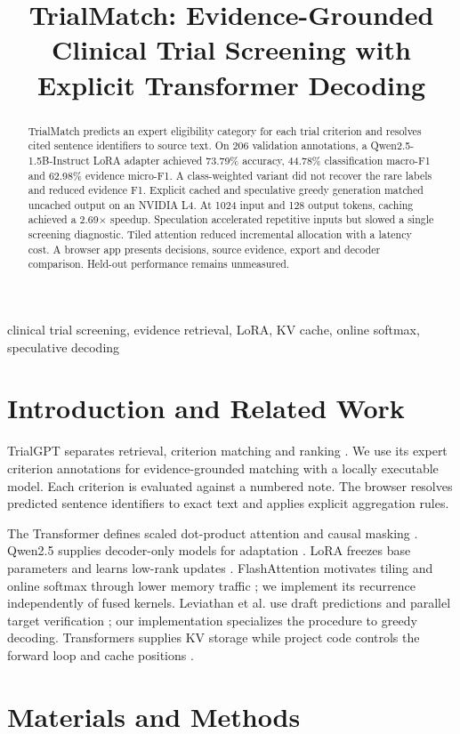 \documentclass[conference]{IEEEtran}
\title{TrialMatch: Evidence-Grounded Clinical Trial Screening with Explicit Transformer Decoding}
\author{\IEEEauthorblockN{Muhammad Shaffan Ahmad}
\IEEEauthorblockA{23i-0673, Generative AI, Section A\\FAST-NUCES, Islamabad}}
\begin{document}
\maketitle
\begin{abstract}
TrialMatch predicts an expert eligibility category for each trial criterion and resolves cited sentence identifiers to source text. On 206 validation annotations, a Qwen2.5-1.5B-Instruct LoRA adapter achieved 73.79\% accuracy, 44.78\% classification macro-F1 and 62.98\% evidence micro-F1. A class-weighted variant did not recover the rare labels and reduced evidence F1. Explicit cached and speculative greedy generation matched uncached output on an NVIDIA L4. At 1024 input and 128 output tokens, caching achieved a 2.69$\times$ speedup. Speculation accelerated repetitive inputs but slowed a single screening diagnostic. Tiled attention reduced incremental allocation with a latency cost. A browser app presents decisions, source evidence, export and decoder comparison. Held-out performance remains unmeasured.
\end{abstract}
\begin{IEEEkeywords}
clinical trial screening, evidence retrieval, LoRA, KV cache, online softmax, speculative decoding
\end{IEEEkeywords}
\section{Introduction and Related Work}
TrialGPT separates retrieval, criterion matching and ranking \cite{trialgpt}. We use its expert criterion annotations \cite{dataset} for evidence-grounded matching with a locally executable model. Each criterion is evaluated against a numbered note. The browser resolves predicted sentence identifiers to exact text and applies explicit aggregation rules.

The Transformer defines scaled dot-product attention and causal masking \cite{transformer}. Qwen2.5 supplies decoder-only models for adaptation \cite{qwen}. LoRA freezes base parameters and learns low-rank updates \cite{lora}. FlashAttention motivates tiling and online softmax through lower memory traffic \cite{flash}; we implement its recurrence independently of fused kernels. Leviathan et al. use draft predictions and parallel target verification \cite{spec}; our implementation specializes the procedure to greedy decoding. Transformers supplies KV storage while project code controls the forward loop and cache positions \cite{cache}.
\section{Materials and Methods}
\end{document}
